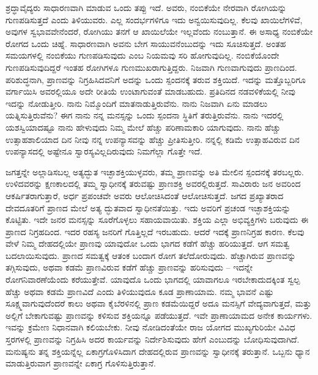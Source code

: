ಶ್ರದ್ಧಾವೈದ್ಯರು ಸಾಧಾರಣವಾಗಿ ಮಾಡುವ ಒಂದು ತಪ್ಪು ಇದೆ. ಅವರು, ನಂಬಿಕೆಯೇ ನೇರವಾಗಿ ರೋಗಿಯನ್ನು ಗುಣಪಡಿಸುತ್ತದೆ ಎಂದು ತಿಳಿಯುವರು. ಎಲ್ಲ ಸಂದರ್ಭಗಳಿಗೂ ಇದು ಅನ್ವಯಿಸುವುದಿಲ್ಲ. ಕೆಲವು ಖಾಯಿಲೆಗಳಿವೆ, ಅವುಗಳ ಸ್ವಭಾವವೇನೆಂದರೆ, ರೋಗಿಯು ತನಗೆ ಆ ಖಾಯಿಲೆಯೇ ಇಲ್ಲವೆಂದು ನಂಬುತ್ತಾನೆ. ಈ ಅಸಾಧ್ಯ ನಂಬಿಕೆಯೇ ರೋಗದ ಒಂದು ಚಿಹ್ನೆ. ಸಾಧಾರಣವಾಗಿ ಅವನು ಬೇಗ ಸಾಯುವನೆಂಬುದನ್ನು ಇದು ಸೂಚಿಸುತ್ತದೆ. ಅಂತಹ ಸಮಯಗಳಲ್ಲಿ ನಂಬಿಕೆಯು ಗುಣಪಡಿಸುವುದು ಎಂಬ ನಿಯಮವು ಸರಿ ಹೋಗುವುದಿಲ್ಲ. ನಂಬಿಕೆಯೊಂದೇ ಗುಣಪಡಿಸುವುದಿದ್ದರೆ ಇಂತಹ ರೋಗಿಗಳೂ ಗುಣಮುಖರಾಗುತ್ತಿದ್ದರು. ನಿಜವಾಗಿ ಗುಣವಾಗುವುದು ಪ್ರಾಣದಿಂದ. ಪರಿಶುದ್ಧನಾಗಿ, ಪ್ರಾಣವನ್ನು ನಿಗ್ರಹಿಸಿದವನಿಗೆ ಅದನ್ನು ಒಂದು ಸ್ಪಂದನಕ್ಕೆ ತರುವ ಶಕ್ತಿಯಿದೆ. ಇದನ್ನು ಮತ್ತೊಬ್ಬರಿಗೂ ವರ್ಗಾಯಿಸಿ ಅವರಲ್ಲಿಯೂ ಅದೇ ರೀತಿಯೆ ಉಂಟಾಗುವಂತೆ ಮಾಡಬಹುದು. ಪ್ರತಿದಿನದ ನಡವಳಿಕೆಯಲ್ಲಿ ನೀವು ಇದನ್ನು ನೋಡುತ್ತೀರಿ. ನಾನು ನಿಮ್ಮೊಂದಿಗೆ ಮಾತನಾಡುತ್ತಿರುವೆನು. ನಾನು ನಿಜವಾಗಿ ಏನು ಮಾಡಲು ಯತ್ನಿಸುತ್ತಿರುವೆನು? ಈಗ ನಾನು ನನ್ನ ಮನಸ್ಸನ್ನು ಒಂದು ಸ್ಪಂದನಾ ಸ್ಥಿತಿಗೆ ತರುತ್ತಿರುವೆನು. ನಾನು ಇದರಲ್ಲಿ ಯಶಸ್ವಿಯಾದಷ್ಟೂ ನಾನು ಹೇಳುವುದು ನಿಮ್ಮ ಮೇಲೆ ಹೆಚ್ಚು ಪರಿಣಾಮಕಾರಿ ಯಾಗುವುದು. ನಾನು ಹೆಚ್ಚು ಉತ್ಸಾಹಶಾಲಿಯಾದ ದಿನ ನೀವು ನನ್ನ ಉಪನ್ಯಾಸವನ್ನು ಹೆಚ್ಚು ಪ್ರೀತಿಸುತ್ತೀರಿ. ನನ್ನಲ್ಲಿ ಕಡಿಮೆ ಉತ್ಸಾಹವಿರುವ ದಿನ ಉಪನ್ಯಾಸದಲ್ಲಿ ಅಷ್ಟೇನೂ ಸ್ವಾರಸ್ಯವಿಲ್ಲದಿರುವುದು ನಿಮಗೆಲ್ಲಾ ಗೊತ್ತೇ ಇದೆ. 

ಜಗತ್ತನ್ನೇ ಅಲ್ಲಾಡಿಸಬಲ್ಲ ಅತ್ಯದ್ಭುತ ಇಚ್ಛಾಶಕ್ತಿಯುಳ್ಳವರು, ತಮ್ಮ ಪ್ರಾಣವನ್ನು ಅತಿ ಮೇಲಿನ ಸ್ಪಂದನಕ್ಕೆ ತರಬಲ್ಲರು. ಉಳಿದವರನ್ನು ಕ್ಷಣಕಾಲದಲ್ಲಿ ತಮ್ಮ ಸ್ವಾಧೀನಕ್ಕೆ ತರುವಷ್ಟು ಪ್ರಾಣಶಕ್ತಿ ಅವರಲ್ಲಿರುತ್ತದೆ. ಸಾವಿರಾರು ಜನ ಅವರಿಂದ ಆಕರ್ಷಿತರಾಗುತ್ತಾರೆ, ಅರ್ಧ ಪ್ರಪಂಚವೇ ಅವರು ಆಲೋಚಿಸಿದಂತೆ ಆಲೋಚಿಸುತ್ತದೆ. ಜಗದ ಪ್ರಖ್ಯಾತರಾದ ದೇವದೂತರಿಗೆ ಪ್ರಾಣದ ಮೇಲೆ ಅತ್ಯ ದ್ಭುತವಾದ ಸ್ವಾಧೀನತೆಯಿತ್ತು. ಇದು ಅವರಿಗೆ ಪ್ರಚಂಡ ಇಚ್ಛಾಶಕ್ತಿಯನ್ನು ಕೊಟ್ಟಿತು. ಇದೇ ಜನರ ಮನಸ್ಸನ್ನು ಸೂರೆಗೊಳ್ಳಲು ಸಹಾಯವಾಯಿತು. ಶಕ್ತಿಯ ಎಲ್ಲಾ ಅಭಿವ್ಯಕ್ತಿಗಳು ಬರುವುದು ಈ ಪ್ರಾಣದ ನಿಗ್ರಹದಿಂದ. ಇದರ ರಹಸ್ಯ ಜನರಿಗೆ ಗೊತ್ತಿಲ್ಲದೆ ಇರಬಹುದು. ಆದರೆ ಇದಕ್ಕೆ ಪ್ರಾಣನಿಗ್ರಹ ಕಾರಣ. ಕೆಲವು ವೇಳೆ ನಿಮ್ಮ ದೇಹದಲ್ಲಿಯೇ ಪ್ರಾಣವು ಯಾವುದೋ ಒಂದು ಭಾಗದ ಕಡೆಗೆ ಹೆಚ್ಚು ಹರಿಯುತ್ತದೆ. ಆಗ ಸಮತ್ವ ಬದಲಾಯಿಸುವುದು. ಪ್ರಾಣದ ಸಮತ್ವಕ್ಕೆ ಆತಂಕ ಬಂದಾಗ ರೋಗ ತಲೆದೋರುವುದು. ಹೆಚ್ಚಾಗಿರುವ ಪ್ರಾಣವನ್ನು ತಗ್ಗಿಸುವುದು, ಅಥವಾ ಕಡಮೆ ಪ್ರಾಣವಿರುವ ಕಡೆಗೆ ಹೆಚ್ಚು ಪ್ರಾಣವನ್ನು ಹರಿಸುವುದು – ಇದನ್ನೇ ರೋಗನಿವಾರಣೆಯೆಂದು ಕರೆಯುತ್ತೇವೆ. ಯಾವುದೊ ಒಂದು ಭಾಗದಲ್ಲಿ ಯಾವಾಗಲೂ ಇರಬೇಕಾದುದಕ್ಕಿಂತ ಸ್ವಲ್ಪ ಹೆಚ್ಚು ಅಥವಾ ಕಡಮೆ ಪ್ರಾಣವಿದೆ ಎಂದು ತಿಳಿಯುವುದೂ ಕೂಡ ಪ್ರಾಣಾಯಾಮ. ನಮ್ಮ ಭಾವನೆ ಎಷ್ಟು ಸೂಕ್ಷ್ಮವಾಗುವುದೆಂದರೆ ಕಾಲು ಅಥವಾ ಕೈಬೆರಳಿನಲ್ಲಿ ಪ್ರಾಣ ಕಡಮೆಯಿದ್ದರೆ ಅದೂ ಮನಸ್ಸಿಗೆ ವೇದ್ಯವಾಗುತ್ತದೆ, ಮತ್ತು ಅಲ್ಲಿಗೆ ಬೇಕಾಗುವಷ್ಟು ಪ್ರಾಣವನ್ನು ಕಳಿಸುವ ಶಕ್ತಿಯನ್ನೂ ಪಡೆಯುತ್ತದೆ. ಇವೇ ಪ್ರಾಣಾಯಾಮದ ಅನೇಕ ಕಾರ್ಯಗಳು. ಇವನ್ನು ಕ್ರಮೇಣ ನಿಧಾನವಾಗಿ ಕಲಿಯಬೇಕು. ನೀವು ನೋಡಿದಂತೆಯೇ ರಾಜ ಯೋಗದ ಮುಖ್ಯಗುರಿಯೇ ವಿವಿಧ ಸ್ತರಗಳಲ್ಲಿ ಪ್ರಾಣವನ್ನು ನಿಗ್ರಹಿಸಿ ಅದರ ಕಾರ್ಯವನ್ನು ನಿರ್ದೇಶಿಸುವುದು ಹೇಗೆ ಎಂಬುದನ್ನು ಬೋಧಿಸುವುದಾಗಿದೆ. ಮನುಷ್ಯನು ತನ್ನ ಶಕ್ತಿಯನ್ನೆಲ್ಲ ಏಕಾಗ್ರಗೊಳಿಸಿದಾಗ ದೇಹದಲ್ಲಿರುವ ಪ್ರಾಣವನ್ನು ಸ್ವಾಧೀನಕ್ಕೆ ತರುತ್ತಾನೆ. ಒಬ್ಬನು ಧ್ಯಾನ ಮಾಡುತ್ತಿರುವಾಗ ಪ್ರಾಣವನ್ನೇ ಏಕಾಗ್ರ ಗೊಳಿಸುತ್ತಿರುತ್ತಾನೆ. 


